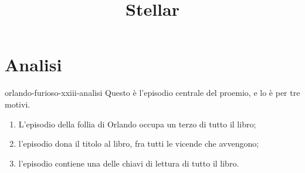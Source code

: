 \documentclass[preview]{standalone}
\begin{document}
\title{Stellar}
\genpage

\section{Analisi}

\begin{snippet}{orlando-furioso-xxiii-analisi}
    Questo è l'episodio centrale del proemio, e lo è per tre motivi.
    \begin{enumerate}
        \item L'episodio della follia di Orlando occupa un terzo di tutto il libro;
        \item l'episodio dona il titolo al libro, fra tutti le vicende che avvengono;
        \item l'episodio contiene una delle chiavi di lettura di tutto il libro.
    \end{enumerate}


\end{snippet}
\end{document}
